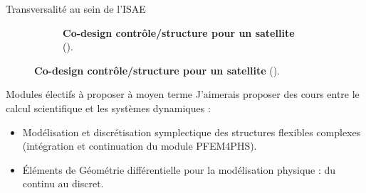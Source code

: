 \documentclass[aspectratio=169, french]{beamer}
\begin{document}
\begin{frame}{Transversalité au sein de l'ISAE}
\begin{figure}[t]
\begin{subfigure}{0.5\textwidth}
		\caption*{\textbf{Co-design contrôle/structure pour un satellite} (\cite{finozzi2022sub}).}
	\end{subfigure}
\end{figure}

\end{frame}


\begin{frame}{Modules électifs à proposer à moyen terme}
J'aimerais proposer des cours entre le calcul scientifique et les systèmes dynamiques :
\begin{itemize}
	\item Modélisation et discrétisation symplectique des structures flexibles complexes (intégration et continuation du module PFEM4PHS).
	\item Éléments de Géométrie différentielle pour la modélisation physique : du continu au discret.
\end{itemize}
\end{frame}
\end{document}
